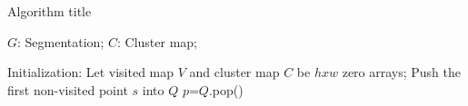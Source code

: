 \begin{algorithm}[!ht]
  \caption{Algorithm title}
  \begin{algorithmic}[1]
    \Require
        $G$: Segmentation;
    \Ensure
        $C$: Cluster map;
    
    \State Initialization:  Let visited map $V$ and cluster map $C$ be $h x w$ zero arrays;
        \State Push the first non-visited point $s$ into $Q$
            \State $p$=$Q$.pop()

        \EndWhile
    \EndWhile

  \end{algorithmic}
\label{alg:algorithm_label}
\end{algorithm}
